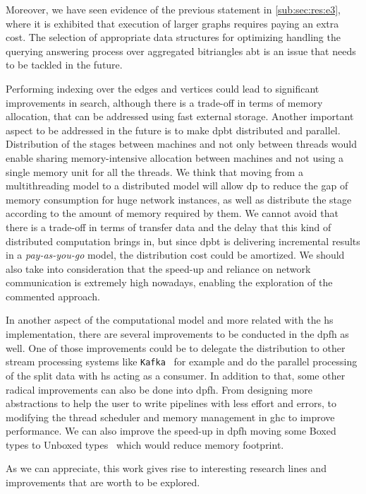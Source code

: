 Moreover, we have seen evidence of the previous statement in \autoref{sub:sec:res:e3}, where it is exhibited that execution of larger graphs requires paying an extra cost.
The selection of appropriate data structures for optimizing handling the querying answering process over aggregated bitriangles  \acrlong{abt} is an issue that needs to be tackled in the future. 

Performing indexing over the edges and vertices could lead to significant improvements in search, although there is a trade-off in terms of memory allocation, that can be addressed using fast external storage.
Another important aspect to be addressed in the future is to make \acrlong{dpbt} distributed and parallel. Distribution of the stages between machines and not only between threads would enable sharing memory-intensive allocation between machines and not using a single memory unit for all the threads.
We think that moving from a multithreading model to a distributed model will allow \acrlong{dp} to reduce the gap of memory consumption for huge network instances, as well as distribute the stage according to the amount of memory required by them. 
We cannot avoid that there is a trade-off in terms of transfer data and the delay that this kind of distributed computation brings in, but since \acrlong{dpbt} is delivering incremental results in a \emph{pay-as-you-go} model, the distribution cost could be amortized. 
We should also take into consideration that the speed-up and reliance on network communication is extremely high nowadays, enabling the exploration of the commented approach.

In another aspect of the computational model and more related with the \acrlong{hs} implementation, there are several improvements to be conducted in the \acrlong{dpfh} as well. 
One of those improvements could be to delegate the distribution to other stream processing systems like \texttt{Kafka}~\cite{kafka} for example and do the parallel processing of the split data with \acrlong{hs} acting as a consumer.
In addition to that, some other radical improvements can also be done into \acrlong{dpfh}. From designing more abstractions to help the user to write pipelines with less effort and errors, to modifying the thread scheduler and memory management in \acrshort{ghc} to improve performance. 
We can also improve the speed-up in \acrlong{dpfh} moving some Boxed types to Unboxed types~\cite{hs-unbox} which would reduce memory footprint.

As we can appreciate, this work gives rise to interesting research lines and improvements that are worth to be explored.

